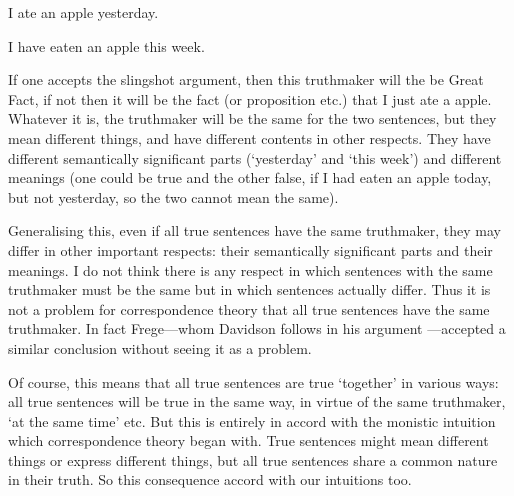 	\begin{example} \label{yesterday}
	I ate an apple yesterday.
	\end{example}

	\begin{example} \label{week}
	I have eaten an apple this week.
	\end{example}

If one accepts the slingshot argument, then this truthmaker will the be Great Fact, if not then it will be the fact (or proposition etc.) that I just ate a apple.
Whatever it is, the truthmaker will be the same for the two sentences, but they mean different things, and have different contents in other respects.
They have different semantically significant parts (`yesterday' and `this week') and different meanings (one could be true and the other false, if I had eaten an apple today, but not yesterday, so the two cannot mean the same).

Generalising this, even if all true sentences have the same truthmaker, they may differ in other important respects: their semantically significant parts and their meanings.
I do not think there is any respect in which sentences with the same truthmaker must be the same but in which sentences actually differ.
Thus it is not a problem for correspondence theory that all true sentences have the same truthmaker.
In fact Frege---whom Davidson follows in his argument \parencite[750]{Davidson_1969}---accepted a similar conclusion without seeing it as a problem.
\parencite[216]{Frege_1948}

Of course, this means that all true sentences are true `together' in various ways: all true sentences will be true in the same way, in virtue of the same truthmaker, `at the same time' etc.
But this is entirely in accord with the monistic intuition which correspondence theory began with.
True sentences might mean different things or express different things, but all true sentences share a common nature in their truth.
So this consequence accord with our intuitions too.
